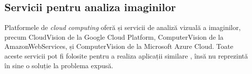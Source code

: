 \subsection{Servicii pentru analiza imaginilor}
Platformele de \textit{cloud computing} oferă și servicii de analiză vizuală a imaginilor, precum CloudVision de la Google Cloud Platform, ComputerVision de la AmazonWebServices, și ComputerVision de la Microsoft Azure Cloud. Toate aceste servicii pot fi folosite pentru a realiza aplicații similare {\applicationtitle}, însă nu reprezintă în sine o soluție la problema expusă.
